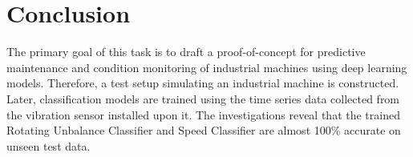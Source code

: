 \documentclass[
  manuscript=report,  %
  layout=preprint,  %
  year=20xx,
  volume=x,
]{extra/joas}
\begin{document}



%


\section{Conclusion}

The primary goal of this task is to draft a proof-of-concept for predictive maintenance and condition monitoring of industrial machines using deep learning models. Therefore, a test setup simulating an industrial machine is constructed. Later, classification models are trained using the time series data collected from the vibration sensor installed upon it. The investigations reveal that the trained Rotating Unbalance Classifier and Speed Classifier are almost 100\% accurate on unseen test data.

\end{document}
